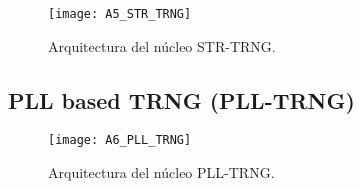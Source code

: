 				
				\begin{figure}[hbtp]
					\caption{Arquitectura del núcleo STR-TRNG.}
					\centering
					\texttt{[image: A5\_STR\_TRNG]}
					\label{fig:A5_STR_TRNG}
				\end{figure}
				
				
				
		\subsection{PLL based TRNG (PLL-TRNG)}
	
				
				\begin{figure}[hbtp]
					\caption{Arquitectura del núcleo PLL-TRNG.}
					\centering
					\texttt{[image: A6\_PLL\_TRNG]}
					\label{fig:A6_PLL_TRNG}
				\end{figure}
				
				
			
		   



